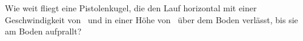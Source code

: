 Wie weit fliegt eine Pistolenkugel, die den Lauf horizontal mit einer Geschwindigkeit von \vpO\ und in einer Höhe von \hpO\ über dem Boden verlässt, bis sie am Boden aufprallt?
